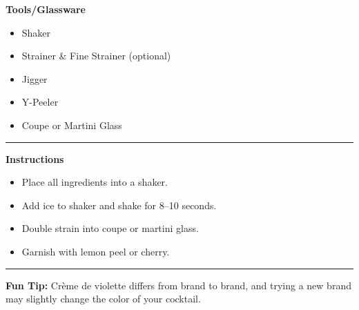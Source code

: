 \hspace{.01\textwidth}\vrule\hspace{.01\textwidth}
\begin{minipage}[t]{.49\textwidth}
    \noindent
    \textbf{\large Tools/Glassware}
    \begin{itemize}
        \item Shaker
        \item Strainer & Fine Strainer (optional)
        \item Jigger
        \item Y-Peeler
        \item Coupe or Martini Glass
    \end{itemize}
\end{minipage}
\vspace{.5em}\hrule\vspace{.5em}
\noindent
\begin{minipage}{\textwidth}
    \noindent
    \textbf{\large Instructions}
    \begin{itemize}
        \item Place all ingredients into a shaker.
        \item Add ice to shaker and shake for 8--10 seconds.
        \item Double strain into coupe or martini glass.
        \item Garnish with lemon peel or cherry.
    \end{itemize}
\end{minipage}
\vspace{.5em}\hrule\vspace{.5em}
\noindent
\textbf{\large Fun Tip:} Crème de violette differs from brand to brand, and trying a new brand may slightly change the color of your cocktail.
\newpage
